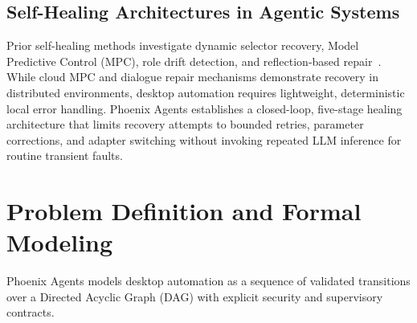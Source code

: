 \documentclass[conference]{IEEEtran}
\begin{document}
\subsection{Self-Healing Architectures in Agentic Systems}
Prior self-healing methods investigate dynamic selector recovery, Model Predictive Control (MPC), role drift detection, and reflection-based repair~\cite{babu2026,jeong2026,guo2026,ju2025,wang2026,patel2026a,patel2026b,wu2025,mulian2026}. While cloud MPC and dialogue repair mechanisms demonstrate recovery in distributed environments, desktop automation requires lightweight, deterministic local error handling. Phoenix Agents establishes a closed-loop, five-stage healing architecture that limits recovery attempts to bounded retries, parameter corrections, and adapter switching without invoking repeated LLM inference for routine transient faults.

\section{Problem Definition and Formal Modeling}

Phoenix Agents models desktop automation as a sequence of validated transitions over a Directed Acyclic Graph (DAG) with explicit security and supervisory contracts.
\end{document}
